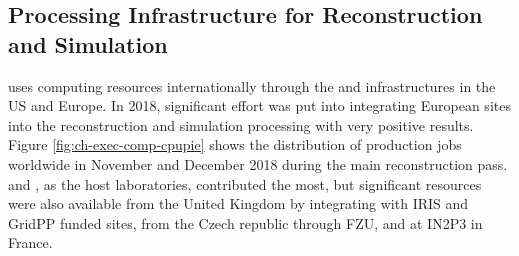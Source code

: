 \subsection{Processing Infrastructure for Reconstruction and Simulation}
\label{ch-comp-processing}
 uses computing resources internationally through the  and  infrastructures in the US and Europe.  In 2018, significant effort was put into integrating European sites into the  reconstruction and simulation processing with very positive results.  
Figure \ref{fig:ch-exec-comp-cpupie} shows the distribution of production jobs worldwide in November and December 2018 during the main reconstruction pass.   and , as the host laboratories, contributed the most, but significant resources were also available from the United Kingdom by integrating with IRIS and GridPP funded sites, from the Czech republic through FZU, and at IN2P3 in France. 



